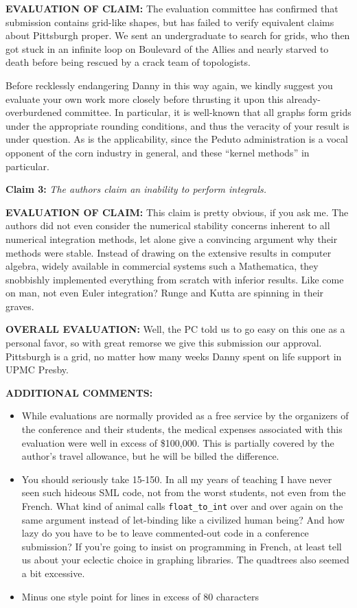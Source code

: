 \documentclass[12pt]{article}
\begin{document}
\textbf{EVALUATION OF CLAIM:}
  The evaluation committee has confirmed that submission contains
  grid-like shapes, but has failed to verify equivalent claims about Pittsburgh proper. We sent an
  undergraduate to search for grids, who then got stuck in an infinite loop on Boulevard of the Allies
  and nearly starved to death before being rescued by a crack team of topologists.

  Before recklessly endangering Danny in this way again, we kindly suggest you evaluate your own
  work more closely before thrusting it upon this already-overburdened committee. In particular, it
  is well-known that all graphs form grids under the appropriate rounding conditions, and thus the
  veracity of your result is under question. As is the applicability, since the Peduto administration is
  a vocal opponent of the corn industry in general, and these ``kernel methods'' in particular.

\textbf{Claim 3:}  \textit{The authors claim an inability to perform integrals.}

\textbf{EVALUATION OF CLAIM:}
  This claim is pretty obvious, if you ask me. The authors did not even
  consider the numerical stability concerns inherent to all numerical integration methods, let alone
  give a convincing argument why their methods were stable. Instead of drawing on the extensive
  results in computer algebra, widely available in commercial systems such a Mathematica, they
  snobbishly implemented everything from scratch with inferior results. Like come on man, not even Euler integration? Runge and Kutta are spinning in their graves.

\textbf{OVERALL EVALUATION:}
 Well, the PC told us to go easy on this one as a personal favor, so
 with great remorse we give this submission our approval. Pittsburgh is a grid, no matter how many
 weeks Danny spent on life support in UPMC Presby.

\textbf{ADDITIONAL COMMENTS:}
\begin{itemize}
\item While evaluations are normally provided as a free service by the organizers of the conference
and their students, the medical expenses associated with this evaluation were well in excess
of \$100,000. This is partially covered by the author's travel allowance, but he will be billed
the difference.

\item You should seriously take 15-150. In all my years of teaching I have never seen such hideous
SML code, not from the worst students, not even from the French. What kind of animal calls
\texttt{float\_to\_int} over and over again on the same argument instead of let-binding like a
civilized human being? And how lazy do you have to be to leave commented-out code in a
conference submission? If you’re going to insist on programming in French, at least tell us
about your eclectic choice in graphing libraries. The quadtrees also seemed a bit excessive.

\item Minus one style point for lines in excess of 80 characters
\end{itemize}
 
\end{document}
